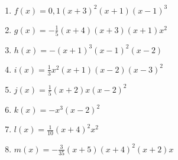 \begin{Exercise}[title={Skizziere das Schaubild}, label=ganzProduktA1]\\
	\begin{minipage}{\textwidth}
		\begin{minipage}{0.5\textwidth}
			\begin{enumerate}[label=\alph*)]
				\item \(f(x)=0,1\left(x+3\right)^2\left(x+1\right)\left(x-1\right)^3\)
				\item \(g(x)=-\frac{1}{5}\left(x+4\right) \left(x+3\right) \left(x+1\right) x^2 \)
				\item \(h(x)=-\left(x+1\right)^3 \left(x-1\right)^2 \left(x-2\right)\)
				\item \(i(x)=\frac{1}{3}x^2\left(x+1\right) \left( x-2\right) \left( x-3\right) ^2\)
			\end{enumerate}
		\end{minipage}%
		\begin{minipage}{0.5\textwidth}
			\begin{enumerate}[label=\alph*)]
				\setcounter{enumi}{4}
				\item \(j(x)=\frac{1}{5}\left( x+2\right) x\left( x-2\right) ^2\)
				\item \(k(x)=-x^3\left( x-2\right) ^2\)
				\item \(l(x)=\frac{1}{10}\left( x+4\right) ^2 x^2\)
				\item \(m(x)=-\frac{3}{35}\left( x+5\right) \left( x+4\right) ^2\left( x+2\right) x\)
			\end{enumerate}
		\end{minipage}%
	\end{minipage}
\end{Exercise}

